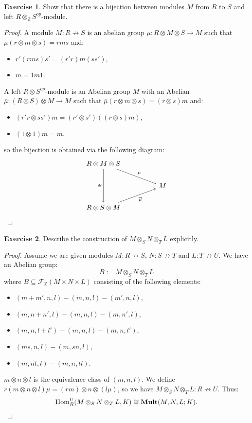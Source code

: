 \documentclass[8pt]{article}
\theoremstyle{definition}
\theoremstyle{definition}
\theoremstyle{definition}
\theoremstyle{definition}
\theoremstyle{definition}
\theoremstyle{definition}
\theoremstyle{definition}
\theoremstyle{definition}
\theoremstyle{definition}
\theoremstyle{definition}
\theoremstyle{definition}
\theoremstyle{definition}
\theoremstyle{definition}
\newtheorem{exercise}{Exercise}[section]
\theoremstyle{definition}
\theoremstyle{question}
\begin{document}
\begin{exercise}
  Show that there is a bijection between modules $M$ from $R$ to $S$ and left $R \otimes_{\mathbb{Z}} S^{op}$-module.
\end{exercise}

\begin{proof}
  A module $M : R \not\to S$ is an abelian group $\mu : R \otimes M \otimes S \to M$ such that
  $\mu(r \otimes m \otimes s) = rms$ and:
  \begin{itemize}
    \item $r'(rms)s' = (r'r)m(ss')$,
    \item $m = 1 m 1$.
  \end{itemize}
  
  A left $R \otimes S^{op}$-module is an Abelian group $M$ with an Abelian $\overline{\mu} : (R \otimes S) \otimes M \to M$
  such that $\overline{\mu}(r \otimes m \otimes s) = (r \otimes s) m$ and:
  \begin{itemize}
    \item $(r'r \otimes ss') m = (r' \otimes s')((r \otimes s)m)$, 
    \item $(1 \otimes 1) m = m$.
  \end{itemize}
  so the bijection is obtained via the following diagram:
    \[
    \begin{tikzcd}
      R \otimes M \otimes S \ar[dd, "\cong"'] \ar[drr, "\mu"] \\
      && M \\
      R \otimes S \otimes M \ar[urr, "\overline{\mu}"'] 
    \end{tikzcd}
    \]
\end{proof}

\begin{exercise}
  Describe the construction of $M \otimes_S N \otimes_T L$ explicitly.
\end{exercise}

\begin{proof}
  Assume we are given modules $M : R \not\to S$, $N : S \not\to T$ and $L : T \not\to U$. We have an Abelian group:
  \[
  B := M \otimes_S N \otimes_T L
  \]
  where $B \subseteq \mathcal{F}_{\mathbb{Z}}(M \times N \times L)$ consisting of the following elements:
  \begin{itemize}
    \item $(m + m', n, l) - (m, n, l) - (m', n, l)$,
    \item $(m, n + n', l) - (m, n, l) - (m, n', l)$,
    \item $(m, n, l + l') - (m,n,l) - (m,n,l')$,
    \item $(ms, n, l) - (m, sn, l)$,
    \item $(m, nt, l) - (m, n, tl)$.
  \end{itemize}

  $m \otimes n \otimes l$ is the equivalence class of $(m, n, l)$. We define $r(m \otimes n \otimes l)\mu = (rm) \otimes n \otimes (l\mu)$,
  so we have $M \otimes_S N \otimes_T L : R \not\to U$. Thus:
  \[
  \operatorname{Hom}^U_R(M \otimes_S N \otimes_T L, K) \cong {\bf Mult}(M, N, L; K).
  \]
\end{proof}
\end{document}
